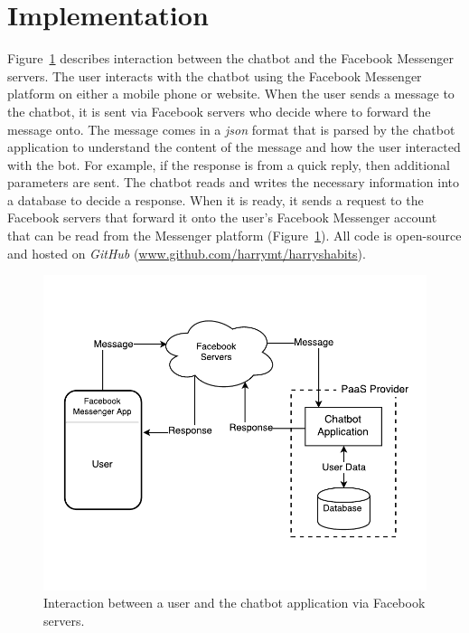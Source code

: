 
\section{Implementation}

Figure~\ref{fig:prototype_component_overview} describes interaction between the chatbot and the Facebook Messenger servers. The user interacts with the chatbot using the Facebook Messenger platform on either a mobile phone or website. When the user sends a message to the chatbot, it is sent via Facebook servers who decide where to forward the message onto. The message comes in a \textit{json} format that is parsed by the chatbot application to understand the content of the message and how the user interacted with the bot. For example, if the response is from a quick reply, then additional parameters are sent. The chatbot reads and writes the necessary information into a database to decide a response. When it is ready, it sends a request to the Facebook servers that forward it onto the user's Facebook Messenger account that can be read from the Messenger platform (Figure~\ref{fig:prototype_component_overview}). All code is open-source and hosted on \textit{GitHub} (\url{www.github.com/harrymt/harryshabits}).

\begin{figure}[H]
    \centering
    \includegraphics[width=5.1in]{../resources/diagrams/chatbot-component-overview.pdf}
    \caption{Interaction between a user and the chatbot application via Facebook servers.}
    \label{fig:prototype_component_overview}
\end{figure}

